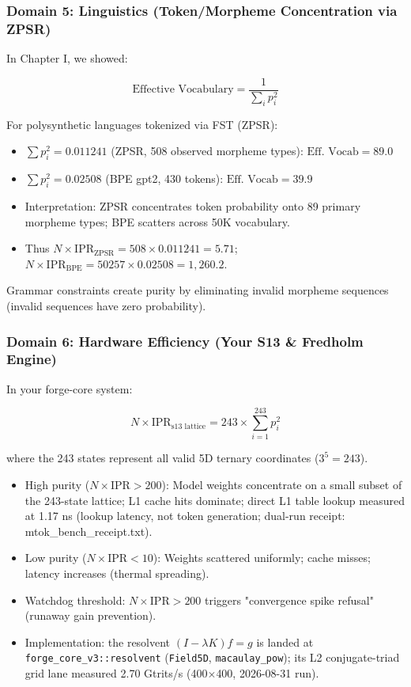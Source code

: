 \documentclass[11pt,oneside]{article}
\theoremstyle{definition}
\begin{document}
\subsubsection{Domain 5: Linguistics (Token/Morpheme Concentration via ZPSR)}

In Chapter I, we showed:

\[
\text{Effective Vocabulary} = \frac{1}{\sum_i p_i^2}
\]

For polysynthetic languages tokenized via FST (ZPSR):
\begin{itemize}
  \item $\sum p_i^2 = 0.011241$ (ZPSR, 508 observed morpheme types): $\text{Eff. Vocab} = 89.0$
  \item $\sum p_i^2 = 0.02508$ (BPE gpt2, 430 tokens): $\text{Eff. Vocab} = 39.9$
  \item Interpretation: ZPSR concentrates token probability onto 89 primary morpheme types; BPE scatters across 50K vocabulary.
  \item Thus $N \times \text{IPR}_{\text{ZPSR}} = 508 \times 0.011241 = 5.71$; $N \times \text{IPR}_{\text{BPE}} = 50257 \times 0.02508 = 1,260.2$.
\end{itemize}

Grammar constraints create purity by eliminating invalid morpheme sequences (invalid sequences have zero probability).

\subsubsection{Domain 6: Hardware Efficiency (Your S13 \& Fredholm Engine)}

In your forge-core system:

\[
N \times \text{IPR}_{\text{s13 lattice}} = 243 \times \sum_{i=1}^{243} p_i^2
\]

where the 243 states represent all valid 5D ternary coordinates ($3^5 = 243$).

\begin{itemize}
  \item High purity ($N \times \text{IPR} > 200$): Model weights concentrate on a small subset of the 243-state lattice; L1 cache hits dominate; direct L1 table lookup measured at 1.17 ns (lookup latency, not token generation; dual-run receipt: mtok\_bench\_receipt.txt).
  \item Low purity ($N \times \text{IPR} < 10$): Weights scattered uniformly; cache misses; latency increases (thermal spreading).
  \item Watchdog threshold: $N \times \text{IPR} > 200$ triggers "convergence spike refusal" (runaway gain prevention).
  \item Implementation: the resolvent $(I - \lambda K)f = g$ is landed at \texttt{forge\_core\_v3::resolvent} (\texttt{Field5D}, \texttt{macaulay\_pow}); its L2 conjugate-triad grid lane measured 2.70 Gtrits/s (400$\times$400, 2026-08-31 run).
\end{itemize}
\end{document}
